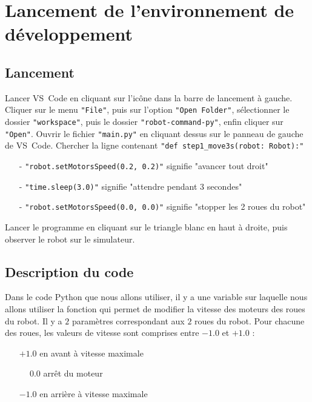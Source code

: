 \documentclass{report}
\begin{document}
\section{Lancement de l'environnement de développement}

\subsection{Lancement}

\begin{itemize}
\step Lancer VS~Code en cliquant sur l'icône  dans la barre de lancement à gauche.
\step Cliquer sur le menu \texttt{"File"}, puis sur l'option \texttt{"Open Folder"}, sélectionner le dossier \texttt{"workspace"}, puis le dossier \texttt{"robot-command-py"}, enfin cliquer sur \texttt{"Open"}.
\step Ouvrir le fichier \texttt{"main.py"} en cliquant dessus sur le panneau de gauche de VS~Code.
\step Chercher la ligne contenant \texttt{"def step1\_move3s(robot:~Robot):"}
    \begin{itemize}
    \item[-] \texttt{"robot.setMotorsSpeed(0.2, 0.2)"} signifie "avancer tout droit"
    \item[-] \texttt{"time.sleep(3.0)"} signifie "attendre pendant 3 secondes"
    \item[-] \texttt{"robot.setMotorsSpeed(0.0, 0.0)"} signifie "stopper les 2 roues du robot"
    \end{itemize}
\step Lancer le programme en cliquant sur le triangle blanc  en haut à droite, puis observer le robot sur le simulateur.
\end{itemize}

\subsection{Description du code}

Dans le code Python que nous allons utiliser, il y a une variable  sur laquelle nous allons utiliser la
fonction  qui permet de modifier la vitesse des
moteurs des roues du robot.
Il y a $2$ paramètres correspondant aux $2$ roues du robot.
Pour chacune des roues, les valeurs de vitesse sont comprises entre $-1.0$ et $+1.0$ :
\begin{itemize}
\item[$+1.0$] en avant à vitesse maximale
\item[$\phantom{+}0.0$] arrêt du moteur
\item[$-1.0$] en arrière à vitesse maximale
\end{itemize}
\end{document}
